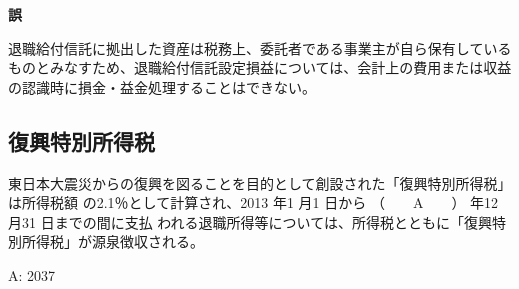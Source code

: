 \begin{answerbox}
  \textbf{誤}

  退職給付信託に拠出した資産は税務上、委託者である事業主が自ら保有しているものとみなすため、退職給付信託設定損益については、会計上の費用または収益の認識時に損金・益金処理することはできない。
\end{answerbox}

\newpage

\subsection{復興特別所得税}

\begin{fillblank}[年金1 2019 問題1(4)\textcircled{6}]
  東日本大震災からの復興を図ることを目的として創設された「復興特別所得税」は所得税額
の2.1％として計算され、2013 年1 月1 日から （　　A　　） 年12 月31 日までの間に支払
われる退職所得等については、所得税とともに「復興特別所得税」が源泉徴収される。
\end{fillblank}

\begin{answerbox}
  A: 2037
\end{answerbox}